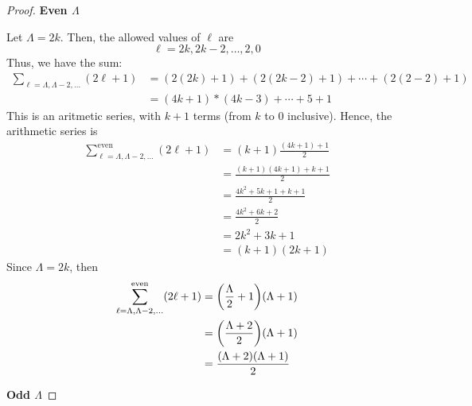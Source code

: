 \documentclass[12pt,a4paper]{article}
\begin{document}
\begin{solution_pset}
\begin{proof}
			\newpage
			\noindent\textbf{Even $\Lambda$}

			Let $\Lambda = 2k$. Then, the allowed values of $\ell$ are
			\begin{equation}
				\ell = 2k, 2k-2,\ldots,2,0
			\end{equation}
			Thus, we have the sum:
			\begin{align*}
				\sum_{\ell=\Lambda, \Lambda-2,\ldots}(2\ell+1) 
				&= (2(2k) + 1) + (2(2k-2) + 1) + \cdots + (2(2 - 2) + 1)\\
				&= (4k  + 1) * (4k - 3) + \cdots + 5 + 1 
			\end{align*}
			This is an aritmetic series, with $k + 1$ terms (from $k$ to 0 inclusive). Hence, the 
			arithmetic series is 
			\begin{align*}
				\sum^{\text{even}}_{\ell=\Lambda, \Lambda-2,\ldots}(2\ell+1) 
				&= (k+1) \frac{(4k + 1) + 1}{2} \\
				&= \frac{(k+1)(4k+1) + k + 1}{2}\\
				&= \frac{4k^2 + 5k + 1 + k + 1}{2}\\
				&= \frac{4k^2 + 6k + 2}{2}\\
				&= 2k^2 + 3k + 1\\
				&= (k+1)(2k+1)
			\end{align*}
			Since $\Lambda = 2k$, then
			\begin{align*}
				\sum^{\text{even}}_{\ell=\Lambda, \Lambda-2,\ldots}(2\ell+1) 
				&= \pqty{\frac{\Lambda}{2}+1}(\Lambda + 1)\\
				&= \pqty{\frac{\Lambda + 2}{2}}(\Lambda + 1)\\
				&= \frac{(\Lambda + 2)(\Lambda + 1)}{2} 
			\end{align*}

			\noindent\textbf{Odd $\Lambda$}


\end{proof}
\end{solution_pset}
\end{document}

